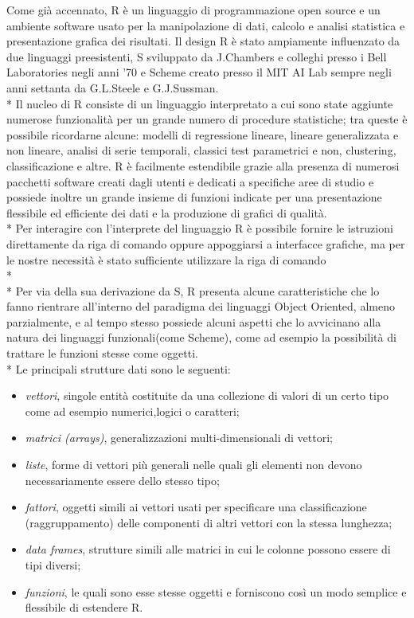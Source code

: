 \documentclass[12pt,a4paper,openright,twoside]{report}
\begin{document}
Come già accennato, R è un linguaggio di programmazione open source e un ambiente software usato per la manipolazione di dati, calcolo e analisi statistica e presentazione grafica dei risultati. Il design R è stato ampiamente influenzato da due linguaggi preesistenti, S sviluppato da J.Chambers e colleghi presso i Bell Laboratories negli anni '70 e Scheme creato presso il MIT AI Lab sempre negli anni settanta da G.L.Steele e G.J.Sussman. \\*
Il nucleo di R consiste di un linguaggio interpretato a cui sono state aggiunte numerose funzionalità per un grande numero di procedure statistiche;  tra queste è possibile ricordarne alcune: modelli di regressione lineare, lineare generalizzata e non lineare, analisi di serie temporali, classici test parametrici e non, clustering, classificazione e altre. R è facilmente estendibile grazie alla presenza di numerosi pacchetti software creati dagli utenti e dedicati a specifiche aree di studio e possiede inoltre un grande insieme di funzioni indicate per una presentazione flessibile ed efficiente dei dati e la produzione di grafici di qualità.\\*
Per interagire con l'interprete del linguaggio R è possibile fornire le istruzioni direttamente da riga di comando oppure appoggiarsi a interfacce grafiche, ma per le nostre necessità è stato sufficiente utilizzare la riga di comando\\* \\* 
Per via della sua derivazione da S, R presenta alcune caratteristiche che lo fanno rientrare all'interno del paradigma dei linguaggi Object Oriented, almeno parzialmente, e al tempo stesso possiede alcuni aspetti che lo avvicinano alla natura dei linguaggi funzionali(come Scheme), come ad esempio la possibilità di trattare le funzioni stesse come oggetti.\\* Le principali strutture dati sono le seguenti: \begin{itemize}
\item \emph{vettori}, singole entità costituite da una collezione di valori di un certo tipo come ad esempio numerici,logici o caratteri;
\item \emph{matrici (arrays)}, generalizzazioni multi-dimensionali di vettori;
\item \emph{liste}, forme di vettori più generali nelle quali gli elementi non devono necessariamente essere dello stesso tipo;
\item \emph{fattori}, oggetti simili ai vettori usati per specificare una classificazione (raggruppamento) delle componenti di altri vettori con la stessa lunghezza;
\item \emph{data frames}, strutture simili alle matrici in cui le colonne possono essere di tipi diversi;
\item \emph{funzioni}, le quali sono esse stesse oggetti e forniscono così un modo semplice e flessibile di estendere R.
\end{itemize}
\end{document}
